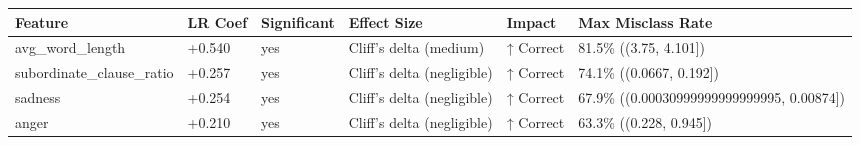 \begin{tabular}{llllll}
\toprule
Feature & LR Coef & Significant & Effect Size & Impact & Max Misclass Rate \\
\midrule
avg\_word\_length & +0.540 & yes & Cliff's delta (medium) & ↑ Correct & 81.5\% ((3.75, 4.101]) \\
subordinate\_clause\_ratio & +0.257 & yes & Cliff's delta (negligible) & ↑ Correct & 74.1\% ((0.0667, 0.192]) \\
sadness & +0.254 & yes & Cliff's delta (negligible) & ↑ Correct & 67.9\% ((0.00030999999999999995, 0.00874]) \\
anger & +0.210 & yes & Cliff's delta (negligible) & ↑ Correct & 63.3\% ((0.228, 0.945]) \\
\bottomrule
\end{tabular}
